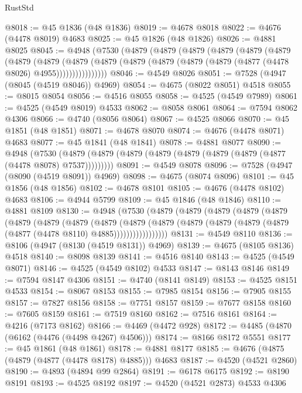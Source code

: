 \begin{lexlean}{RustStd}
\begin{coremodule}
@8018 := @45 @1836 (@48 @1836)
@8019 := @4678 @8018
@8022 := @4676 (@4478 @8019) @4683
@8025 := @45 @1826 (@48 @1826)
@8026 := @4881 @8025
@8045 := @4948
    (@7530
      (@4879
        (@4879
          (@4879
            (@4879
              (@4879
                (@4879
                  (@4879
                    (@4879
                      (@4879
                        (@4879
                          (@4879 (@4879 (@4879 (@4879 (@4877 (@4478 @8026) @4955))))))))))))))))
@8046 := @4549 @8026
@8051 := @7528 (@4947 (@8045 (@4519 @8046)) @4969)
@8054 := @4675 (@8022 @8051) @4518
@8055 := @8015 @8054
@8056 := @4516 @8055
@8058 := @4525 (@4549 @7989)
@8061 := @4525 (@4549 @8019) @4533
@8062 := @8058 @8061
@8064 := @7594 @8062 @4306
@8066 := @4740 (@8056 @8064)
@8067 := @4525 @8066
@8070 := @45 @1851 (@48 @1851)
@8071 := @4678 @8070
@8074 := @4676 (@4478 @8071) @4683
@8077 := @45 @1841 (@48 @1841)
@8078 := @4881 @8077
@8090 := @4948
    (@7530 (@4879 (@4879 (@4879 (@4879 (@4879 (@4879 (@4879 (@4877 (@4478 @8078) @7537)))))))))
@8091 := @4549 @8078
@8096 := @7528 (@4947 (@8090 (@4519 @8091)) @4969)
@8098 := @4675 (@8074 @8096)
@8101 := @45 @1856 (@48 @1856)
@8102 := @4678 @8101
@8105 := @4676 (@4478 @8102) @4683
@8106 := @4944 @5799
@8109 := @45 @1846 (@48 @1846)
@8110 := @4881 @8109
@8130 := @4948
    (@7530
      (@4879
        (@4879
          (@4879
            (@4879
              (@4879
                (@4879
                  (@4879
                    (@4879
                      (@4879
                        (@4879
                          (@4879
                            (@4879 (@4879 (@4879 (@4879 (@4877 (@4478 @8110) @4885)))))))))))))))))
@8131 := @4549 @8110
@8136 := @8106 (@4947 (@8130 (@4519 @8131)) @4969)
@8139 := @4675 (@8105 @8136) @4518
@8140 := @8098 @8139
@8141 := @4516 @8140
@8143 := @4525 (@4549 @8071)
@8146 := @4525 (@4549 @8102) @4533
@8147 := @8143 @8146
@8149 := @7594 @8147 @4306
@8151 := @4740 (@8141 @8149)
@8153 := @4525 @8151 @4533
@8154 := @8067 @8153
@8155 := @7985 @8154
@8156 := @7905 @8155
@8157 := @7827 @8156
@8158 := @7751 @8157
@8159 := @7677 @8158
@8160 := @7605 @8159
@8161 := @7519 @8160
@8162 := @7516 @8161
@8164 := @4216 (@7173 @8162)
@8166 := @4469 (@4472 @928)
@8172 := @4485 (@4870 (@6162 (@4476 (@4498 @4267) @4506)))
@8174 := @8166 @8172 @5551
@8177 := @45 @1861 (@48 @1861)
@8178 := @4881 @8177
@8185 := @4676 (@4875 (@4879 (@4877 (@4478 @8178) @4885))) @4683
@8187 := @4520 (@4521 @2860)
@8190 := @4893 (@4894 @99 @2864)
@8191 := @6178 @6175
@8192 := @8190 @8191
@8193 := @4525 @8192
@8197 := @4520 (@4521 @2873) @4533 @4306

\end{coremodule}
\end{lexlean}
